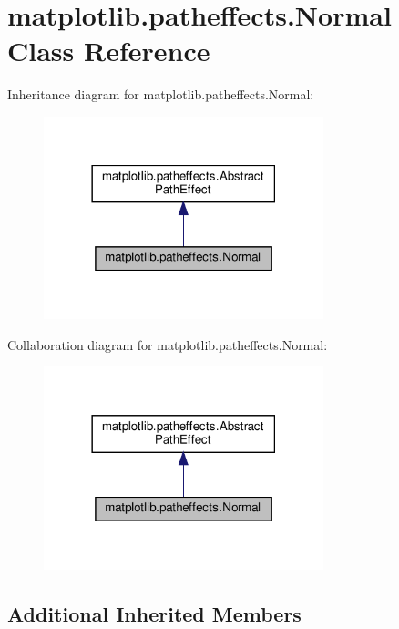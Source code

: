 \hypertarget{classmatplotlib_1_1patheffects_1_1Normal}{}\section{matplotlib.\+patheffects.\+Normal Class Reference}
\label{classmatplotlib_1_1patheffects_1_1Normal}


Inheritance diagram for matplotlib.\+patheffects.\+Normal\+:
\nopagebreak
\begin{figure}[H]
\begin{center}
\leavevmode
\includegraphics[width=230pt]{classmatplotlib_1_1patheffects_1_1Normal__inherit__graph}
\end{center}
\end{figure}


Collaboration diagram for matplotlib.\+patheffects.\+Normal\+:
\nopagebreak
\begin{figure}[H]
\begin{center}
\leavevmode
\includegraphics[width=230pt]{classmatplotlib_1_1patheffects_1_1Normal__coll__graph}
\end{center}
\end{figure}
\subsection*{Additional Inherited Members}


